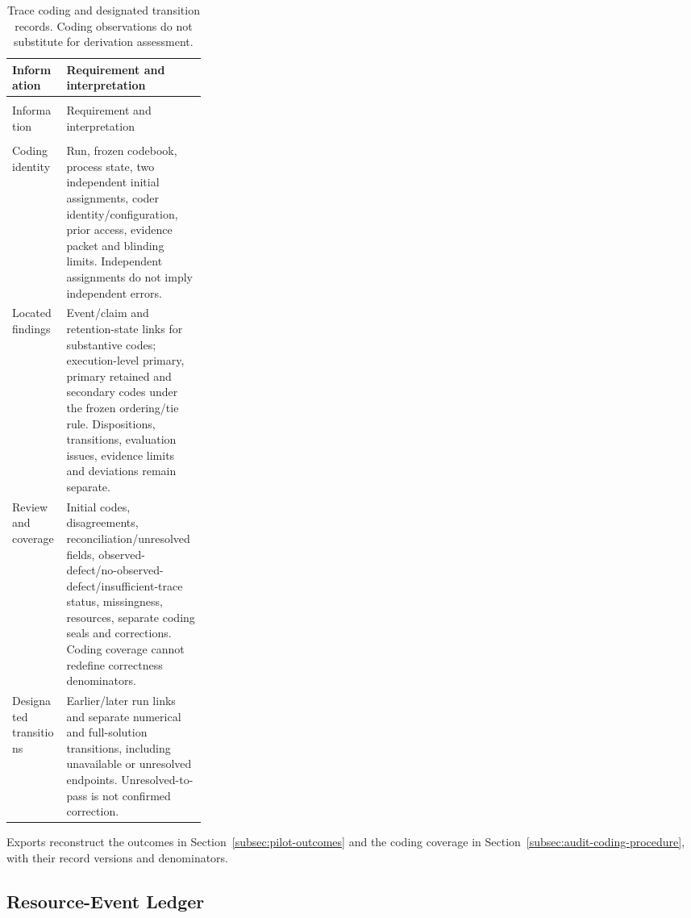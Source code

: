 \documentclass[10pt]{article} %
\providecommand{\1}{\mathbf{1}}  %
\theoremstyle{remark}
\theoremstyle{definition}
\begin{document}
\begingroup
\footnotesize
\renewcommand{\arraystretch}{1.13}
\setlength{\LTpre}{6pt}
\setlength{\LTpost}{8pt}
\setlength{\LTcapwidth}{\linewidth}
\begin{longtable}{@{}>{\raggedright\arraybackslash}p{0.28\linewidth}>{\raggedright\arraybackslash}p{}@{}}
\caption{Trace coding and designated transition records. Coding observations do not substitute for derivation assessment.}\label{tab:trace-coding-ledger}\\
\toprule
Information & Requirement and interpretation \\
\midrule
\endfirsthead
\multicolumn{2}{@{}l}{\textit{Table \thetable\ continued}}\\
\toprule
Information & Requirement and interpretation \\
\midrule
\endhead
\midrule
\multicolumn{2}{r@{}}{\textit{Continued on next page}}\\
\endfoot
\bottomrule
\endlastfoot

Coding identity & Run, frozen codebook, process state, two independent initial assignments, coder identity/configuration, prior access, evidence packet and blinding limits. Independent assignments do not imply independent errors. \\
Located findings & Event/claim and retention-state links for substantive codes; execution-level primary, primary retained and secondary codes under the frozen ordering/tie rule. Dispositions, transitions, evaluation issues, evidence limits and deviations remain separate. \\
Review and coverage & Initial codes, disagreements, reconciliation/unresolved fields, observed-defect/no-observed-defect/insufficient-trace status, missingness, resources, separate coding seals and corrections. Coding coverage cannot redefine correctness denominators. \\
Designated transitions & Earlier/later run links and separate numerical and full-solution transitions, including unavailable or unresolved endpoints. Unresolved-to-pass is not confirmed correction. \\
\end{longtable}
\endgroup

Exports reconstruct the outcomes in Section~\ref{subsec:pilot-outcomes} and
the coding coverage in Section~\ref{subsec:audit-coding-procedure}, with their
record versions and denominators.

\subsection{Resource-Event Ledger}
\label{subsec:ledger-resources}
\end{document}
